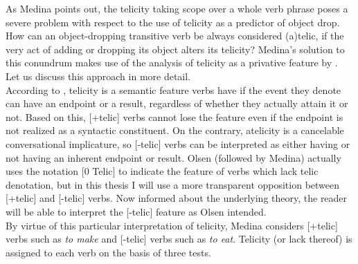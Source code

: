 As Medina points out, the telicity taking scope over a whole verb phrase poses a severe problem with respect to the use of telicity as a predictor of object drop. How can an object-dropping transitive verb be always considered (a)telic, if the very act of adding or dropping its object alters its telicity? Medina's solution to this conundrum makes use of the analysis of telicity as a privative feature by \textcite{Olsen1997telicity-privative}. Let us discuss this approach in more detail.\\
According to \textcite[32]{Olsen1997telicity-privative}, telicity is a semantic feature verbs have if the event they denote can have an endpoint or a result, regardless of whether they actually attain it or not. Based on this, [+telic] verbs cannot lose the feature even if the endpoint is not realized as a syntactic constituent. On the contrary, atelicity is a cancelable conversational implicature, so [-telic] verbs can be interpreted as either having or not having an inherent endpoint or result. Olsen (followed by Medina) actually uses the notation [0 Telic] to indicate the feature of verbs which lack telic denotation, but in this thesis I will use a more transparent opposition between [+telic] and [-telic] verbs. Now informed about the underlying theory, the reader will be able to interpret the [-telic] feature as Olsen intended.\\
By virtue of this particular interpretation of telicity, Medina considers [+telic] verbs such as \textit{to make} and [-telic] verbs such as \textit{to eat}. Telicity (or lack thereof) is assigned to each verb on the basis of three tests.

